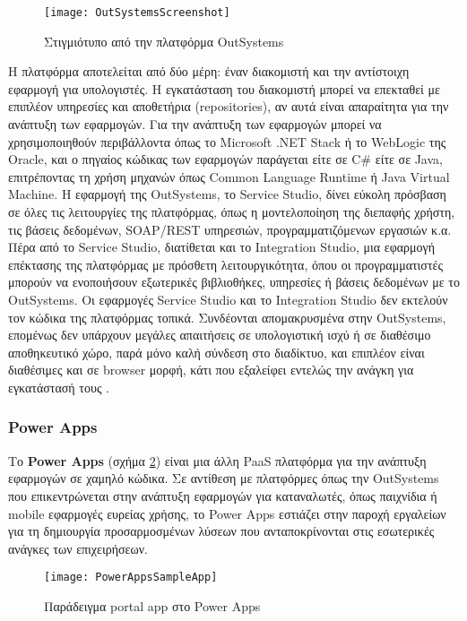             \begin{figure}[h!] \noindent \centering
                \texttt{[image: OutSystemsScreenshot]}
                \caption{\centering Στιγμιότυπο από την πλατφόρμα OutSystems}
                \label{fig:OutSystemsScreenshot}
            \end{figure}

            Η πλατφόρμα αποτελείται από δύο μέρη: έναν διακομιστή και την αντίστοιχη εφαρμογή για υπολογιστές. Η εγκατάσταση του διακομιστή μπορεί να επεκταθεί με επιπλέον υπηρεσίες και αποθετήρια (repositories), αν αυτά είναι απαραίτητα για την ανάπτυξη των εφαρμογών. Για την ανάπτυξη των εφαρμογών μπορεί να χρησιμοποιηθούν περιβάλλοντα όπως το Microsoft .NET Stack ή το WebLogic της Oracle, και ο πηγαίος κώδικας των εφαρμογών παράγεται είτε σε C\# είτε σε Java, επιτρέποντας τη χρήση μηχανών όπως Common Language Runtime ή Java Virtual Machine. Η εφαρμογή της OutSystems, το Service Studio, δίνει εύκολη πρόσβαση σε όλες τις λειτουργίες της πλατφόρμας, όπως η μοντελοποίηση της διεπαφής χρήστη, τις βάσεις δεδομένων, SOAP/REST υπηρεσιών, προγραμματιζόμενων εργασιών κ.α. Πέρα από το Service Studio, διατίθεται και το Integration Studio, μια εφαρμογή επέκτασης της πλατφόρμας με πρόσθετη λειτουργικότητα, όπου οι προγραμματιστές μπορούν να ενοποιήσουν εξωτερικές βιβλιοθήκες, υπηρεσίες ή βάσεις δεδομένων με το OutSystems. Οι εφαρμογές Service Studio και το Integration Studio δεν εκτελούν τον κώδικα της πλατφόρμας τοπικά. Συνδέονται απομακρυσμένα στην OutSystems, επομένως δεν υπάρχουν μεγάλες απαιτήσεις σε υπολογιστική ισχύ ή σε διαθέσιμο αποθηκευτικό χώρο, παρά μόνο καλή σύνδεση στο διαδίκτυο, και επιπλέον είναι διαθέσιμες και σε browser μορφή, κάτι που εξαλείφει εντελώς την ανάγκη για εγκατάστασή τους \cite{OutSystemsGolovin} \cite{OutSystemsSite}.

            \subsubsection{Power Apps}
                Το \textbf{Power Apps} (σχήμα \ref{fig:PowerAppsSampleApp}) είναι μια άλλη PaaS πλατφόρμα για την ανάπτυξη εφαρμογών σε χαμηλό κώδικα. Σε αντίθεση με πλατφόρμες όπως την OutSystems που επικεντρώνεται στην ανάπτυξη εφαρμογών για καταναλωτές, όπως παιχνίδια ή mobile εφαρμογές ευρείας χρήσης, το Power Apps εστιάζει στην παροχή εργαλείων για τη δημιουργία προσαρμοσμένων λύσεων που ανταποκρίνονται στις εσωτερικές ανάγκες των επιχειρήσεων.

                \begin{figure}[h!] \noindent \centering
                    \texttt{[image: PowerAppsSampleApp]}
                    \caption{\centering Παράδειγμα portal app στο Power Apps}
                    \label{fig:PowerAppsSampleApp}
                \end{figure}

